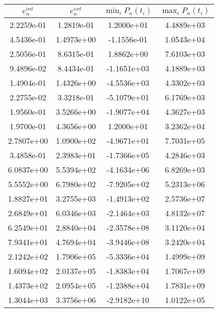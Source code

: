\begin{table}
\centering
\begin{tabular}{||c|c||c|c||}
	\hline
	$e_n^{int}$ & $e_n^{ext}$ & $\min_i P_n(t_i)$ & $\max_i P_n(t_i)$ \\
	\hline\hline
	2.2259e-01 & \cellcolor{blue!25}1.2819e-01 & \cellcolor{red!25}1.2000e+01 & 4.4889e+03 \\
	\hline
	4.5436e-01 & 1.4973e+00 & -1.1556e-01 & 1.0543e+04 \\
	\hline
	2.5056e-01 & 8.6315e-01 & 1.8862e+00 & 7.6103e+03 \\
	\hline
	9.4896e-02 & 8.4434e-01 & -1.1651e+03 & \cellcolor{blue!25}4.1889e+03 \\
	\hline
	1.4904e-01 & 1.4326e+00 & -4.5536e+03 & 4.3302e+03 \\
	\hline
	\cellcolor{blue!25}2.2755e-02 & 3.3218e-01 & -5.1079e+01 & 6.1769e+03 \\
	\hline
	1.9560e-01 & 3.5266e+00 & -1.9077e+04 & 4.3627e+03 \\
	\hline
	1.9700e-01 & 4.3656e+00 & 1.2000e+01 & 3.2362e+04 \\
	\hline
	2.7807e+00 & 1.0900e+02 & -4.9671e+01 & 7.7031e+05 \\
	\hline
	3.4858e-01 & 2.3983e+01 & -1.7366e+05 & 4.2846e+03 \\
	\hline
	6.0837e+00 & 5.5394e+02 & -4.1634e+06 & 6.8269e+03 \\
	\hline
	5.5552e+00 & 6.7980e+02 & -7.9205e+02 & 5.2313e+06 \\
	\hline
	1.8827e+01 & 3.2755e+03 & -1.4913e+02 & 2.5736e+07 \\
	\hline
	2.6849e+01 & 6.0346e+03 & -2.1464e+03 & 4.8132e+07 \\
	\hline
	6.2549e+01 & 2.8840e+04 & -2.3578e+08 & 3.1120e+04 \\
	\hline
	7.9341e+01 & 4.7694e+04 & -3.9446e+08 & 3.2420e+04 \\
	\hline
	2.1242e+02 & 1.7906e+05 & -5.3336e+04 & 1.4999e+09 \\
	\hline
	1.6094e+02 & 2.0137e+05 & -1.8383e+04 & 1.7067e+09 \\
	\hline
	1.4373e+02 & 2.0954e+05 & -1.2388e+04 & \cellcolor{red!25}1.7831e+09 \\
	\hline
	\cellcolor{red!25}1.3044e+03 & \cellcolor{red!25}3.3756e+06 & \cellcolor{blue!25}-2.9182e+10 & 1.0122e+05 \\
	\hline
\end{tabular}
\caption{}
\label{tab:polyfit}
\end{table}